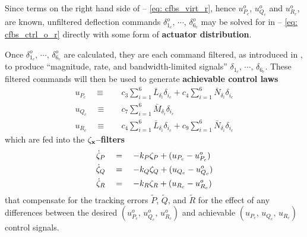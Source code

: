\documentclass[12pt]{ucthesis}
\begin{document}
Since terms on the right hand side of -- \ref{eq: cfbs_virt_r}, hence $u^{o}_{P_c}$, $u^{o}_{Q_c}$ and $u^{o}_{R_c}$, are known, unfiltered deflection commands $\delta^{o}_{1_c},\,\cdots,\,\delta^{o}_{6_c}$ may be solved for in -- \ref{eq: cfbs_ctrl_o_r} directly with some form of \textbf{actuator distribution}.

Once $\delta^{o}_{1_c},\,\cdots,\,\delta^{o}_{6_c}$ are calculated, they are each command filtered, as introduced in , to produce ``magnitude, rate, and bandwidth-limited signals'' $\delta_{1_c},\,\cdots,\,\delta_{6_c}$. These filtered commands will then be used to generate \textbf{achievable control laws}
	\begin{align}
		\label{eq: cfbs_ctrl_p}		u_{P_c} \quad \equiv& \quad c_3 \sum\limits_{i=1}^6 \bar{L}_{\delta_{i}} \delta_{i_c} + c_4 \sum\limits_{i=1}^6 \bar{N}_{\delta_{i}} \delta_{i_c}\\
		\label{eq: cfbs_ctrl_q}		u_{Q_c} \quad \equiv& \quad c_7 \sum\limits_{i=1}^6 \bar{M}_{\delta_{i}} \delta_{i_c}\\
		\label{eq: cfbs_ctrl_r}		u_{R_c} \quad \equiv& \quad c_4 \sum\limits_{i=1}^6 \bar{L}_{\delta_{i}} \delta_{i_c} + c_9 \sum\limits_{i=1}^6 \bar{N}_{\delta_{i}} \delta_{i_c}
	\end{align}
which are fed into the $\mathbf{\zeta_x}$\textbf{--filters}
	\begin{align}
		\label{eq: cfbs_filt_p}	\dot{\zeta}_{P} \quad&=\quad -k_{P} \zeta_{P} + (u_{P_c} - u^{o}_{P_c}) \\
		\label{eq: cfbs_filt_q}	\dot{\zeta}_{Q} \quad&=\quad -k_{Q} \zeta_{Q} + (u_{Q_c} - u^{o}_{Q_c}) \\
		\label{eq: cfbs_filt_r}	\dot{\zeta}_{R} \quad&=\quad -k_{R} \zeta_{R} + (u_{R_c} - u^{o}_{R_c})
	\end{align}
that compensate for the tracking errors $\tilde{P}$, $\tilde{Q}$, and $\tilde{R}$ for the effect of any differences between the desired $(u^o_{P_c},\,u^o_{Q_c},\,u^o_{R_c})$ and achievable $(u_{P_c},\,u_{Q_c},\,u_{R_c})$ control signals.
\end{document}
